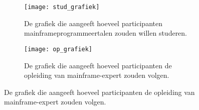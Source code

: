 \begin{figure}[h]
    \centering
    \begin{subfigure}{0.45\textwidth}
        \texttt{[image: stud\_grafiek]}
        \caption{De grafiek die aangeeft hoeveel participanten mainframeprogrammeertalen zouden willen studeren.}
        \label{fig:studeren}
    \end{subfigure}
    \hfill
    \begin{subfigure}{0.45\textwidth}
        \texttt{[image: op\_grafiek]}
        \caption{De grafiek die aangeeft hoeveel participanten de opleiding van mainframe-expert zouden volgen.}
        \label{fig:opleiding}
    \end{subfigure}
\end{figure}



